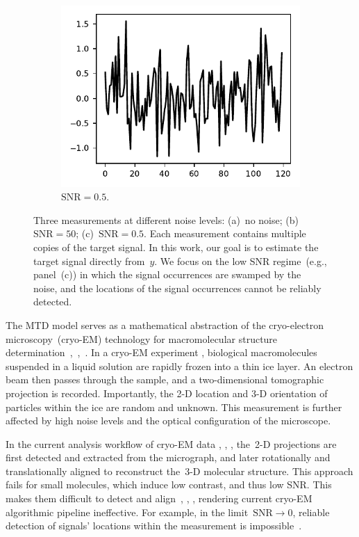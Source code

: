 \documentclass{article}
\begin{document}
\begin{figure}[!tb]
\begin{subfigure}[ht]{0.33\textwidth}
		\includegraphics[width=\columnwidth]{figures/y_SNR01.pdf}
		\caption{$\text{SNR} = 0.5$.}
	\end{subfigure}
	\caption{Three measurements at different noise levels: (a)~no noise; (b)~\mbox{$\text{SNR} = 50$}; (c)~\mbox{$\text{SNR} = 0.5$}. Each measurement contains multiple copies of the target signal. In this work, our goal is to estimate the target signal directly from~$y$. We focus on the low SNR regime~(e.g., panel~(c)) in which the signal occurrences are swamped by the noise, and the locations of the signal occurrences cannot be reliably detected.}
\label{fig:measurements}
\end{figure}

The MTD model serves as a mathematical abstraction of the cryo-electron microscopy~(\mbox{cryo-EM}) technology for macromolecular structure determination~\cite{henderson1995potential},~\cite{nogales2016development},~\cite{bai2015cryo}. In a \mbox{cryo-EM} experiment \cite{frank2006three}, biological macromolecules suspended in a liquid solution are rapidly frozen into a thin ice layer. An electron beam then passes through the sample, and a two-dimensional tomographic projection is recorded. Importantly, the \mbox{2-D} location and \mbox{3-D} orientation of particles within the ice are random and unknown. This measurement is further affected by high noise levels and the optical configuration of the microscope.

In the current analysis workflow of \mbox{cryo-EM} data \cite{bendory2020single}, \cite{scheres2012relion}, \cite{punjani2017cryosparc}, the~\mbox{2-D} projections are first detected and extracted from the micrograph, and later rotationally and translationally aligned to reconstruct the~\mbox{3-D} molecular structure. This approach fails for small molecules, which induce low contrast, and thus low SNR. This makes them difficult to detect and align~\cite{bendory2018toward}, \cite{henderson1995potential}, \cite{aguerrebere2016fundamental}, rendering current \mbox{cryo-EM} algorithmic pipeline ineffective. For example, in the limit~\mbox{$\text{SNR} \rightarrow 0$}, reliable detection of signals' locations within the measurement is impossible~\cite[Proposition~3.1]{bendory2018toward}.
\end{document}
